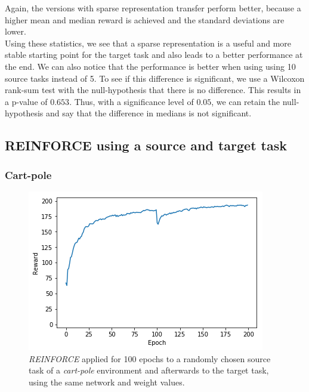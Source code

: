 Again, the versions with sparse representation transfer perform better, because a higher mean and median reward is achieved and the standard deviations are lower.\\
Using these statistics, we see that a sparse representation is a useful and more stable starting point for the target task and also leads to a better performance at the end.
We can also notice that the performance is better when using using 10 source tasks instead of 5. To see if this difference is significant, we use a Wilcoxon rank-sum test with the null-hypothesis that there is no difference. This results in a p-value of $0.653$. Thus, with a significance level of $0.05$, we can retain the null-hypothesis and say that the difference in medians is not significant.

\subsection{REINFORCE using a source and target task} %
\label{sub:reinforce_using_a_source_and_target_task}
\subsubsection{Cart-pole} %
\label{ssub:reinforce_source_target:cart_pole}
\begin{figure}[htb]
    \centering
    \includegraphics[width=.8\linewidth]{images/results/CartPole/reinforce_2tasks.png}
    \caption{\textit{REINFORCE} applied for 100 epochs to a randomly chosen source task of a \textit{cart-pole} environment and afterwards to the target task, using the same network and weight values.}
    \label{fig:carpole:reward_reinforce_2tasks}
\end{figure}
